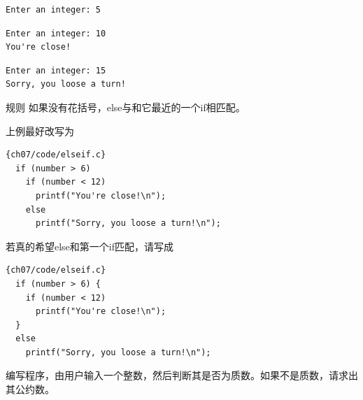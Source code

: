 \begin{frame}[fragile]

\end{frame}

\begin{frame}[fragile]
\begin{lstlisting}
Enter an integer: 5
\end{lstlisting} \pause
 
\begin{lstlisting}
Enter an integer: 10
You're close!
\end{lstlisting} \pause 

\begin{lstlisting}
Enter an integer: 15
Sorry, you loose a turn!
\end{lstlisting}
\end{frame}

\begin{frame}[fragile]
\begin{block}{规则}
如果没有花括号，else与和它最近的一个if相匹配。
\end{block}
\end{frame}

\begin{frame}[fragile]
上例最好改写为
\begin{lstlisting}{ch07/code/elseif.c}
  if (number > 6)
    if (number < 12)
      printf("You're close!\n");
    else
      printf("Sorry, you loose a turn!\n");
\end{lstlisting}
\end{frame}

\begin{frame}[fragile]
若真的希望else和第一个if匹配，请写成
\begin{lstlisting}{ch07/code/elseif.c}
  if (number > 6) {
    if (number < 12)
      printf("You're close!\n");
  }
  else
    printf("Sorry, you loose a turn!\n");
\end{lstlisting}
\end{frame}

\begin{frame}[fragile]
  \begin{li}
    编写程序，由用户输入一个整数，然后判断其是否为质数。如果不是质数，请求出其公约数。
  \end{li}
\end{frame}

